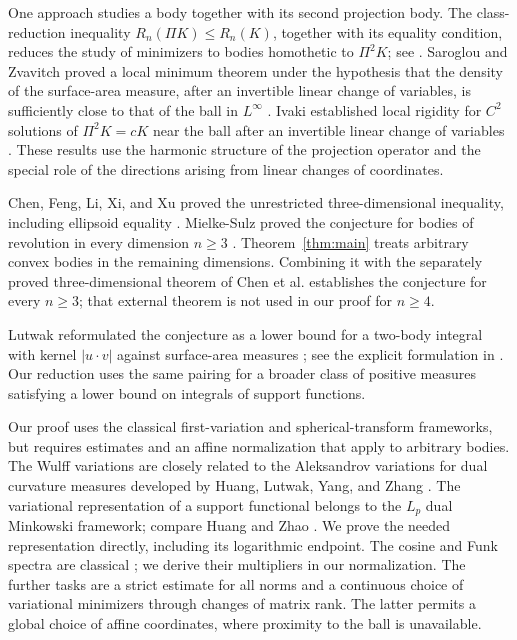 One approach studies a body together with its second projection body.
The class-reduction inequality $R_n(\Pi K)\le R_n(K)$, together with
its equality condition, reduces the study of minimizers to bodies
homothetic to $\Pi^2K$; see \cite[Sections~1--2]{Saroglou2015}.
Saroglou and Zvavitch proved a local minimum theorem under the
hypothesis that the density of the surface-area measure, after an
invertible linear change of variables, is sufficiently close to that
of the ball in $L^\infty$ \cite[Theorem~1.3]{SaroglouZvavitch2017}.
Ivaki established local rigidity for $C^2$ solutions of
$\Pi^2K=cK$ near the ball after an invertible linear change of
variables \cite{Ivaki2018}. These results use the harmonic structure
of the projection operator and the special role of the directions
arising from linear changes of coordinates.

Chen, Feng, Li, Xi, and Xu proved the unrestricted three-dimensional
inequality, including ellipsoid equality
\cite[Theorem~1.1]{ChenEtAl2026}. Mielke-Sulz proved the conjecture
for bodies of revolution in every dimension $n\ge3$
\cite{MielkeSulz2026}. Theorem~\ref{thm:main} treats arbitrary convex
bodies in the remaining dimensions. Combining it with the separately
proved three-dimensional theorem of Chen et al. establishes the
conjecture for every $n\ge3$; that external theorem is not used in our
proof for $n\ge4$.

Lutwak reformulated the conjecture as a lower bound for a two-body
integral with kernel $|u\cdot v|$ against surface-area measures
\cite{LutwakPetty1990}; see the explicit formulation in
\cite[Introduction, item~(i)]{Saroglou2015}.
Our reduction uses the same pairing for a broader class of positive
measures satisfying a lower bound on integrals of support functions.

Our proof uses the classical first-variation and spherical-transform
frameworks, but requires estimates and an affine normalization that
apply to arbitrary bodies. The Wulff variations are closely related
to the Aleksandrov variations for dual curvature measures developed
by Huang, Lutwak, Yang, and Zhang
\cite{HuangLutwakYangZhang2016}. The variational representation of a
support functional belongs to the $L_p$ dual Minkowski framework;
compare Huang and Zhao \cite{HuangZhao2018}. We prove the needed
representation directly, including its logarithmic endpoint.
The cosine and Funk spectra are classical
\cite{OlafssonPasqualeRubin2013}; we derive their multipliers in our
normalization. The further tasks are a strict estimate for all norms
and a continuous choice of variational minimizers through changes of
matrix rank. The latter permits a global choice of affine coordinates,
where proximity to the ball is unavailable.


